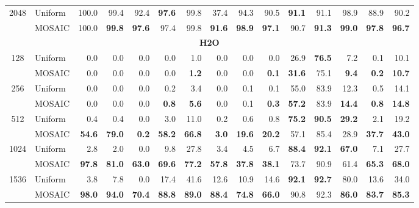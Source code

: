 \begin{table}[tp]
\begin{tabular}{@{} c l rrrrrrrrrrrrr @{}}
    \cmidrule(l){1-15}
    \multirow{2}{*}{2048} & Uniform & 100.0 & 99.4 & 92.4 & \textbf{97.6} & 99.8 & 37.4 & 94.3 & 90.5 & \textbf{91.1} & 91.1 & 98.9 & 88.9 & 90.2 \\
     & MOSAIC & 100.0 & \textbf{99.8} & \textbf{97.6} & 97.4 & 99.8 & \textbf{91.6} & \textbf{98.9} & \textbf{97.1} & 90.7 & \textbf{91.3} & \textbf{99.0} & \textbf{97.8} & \textbf{96.7} \\
    \midrule
    \multicolumn{15}{c}{\textbf{H2O}} \\
    \midrule
    \multirow{2}{*}{128} & Uniform & 0.0 & 0.0 & 0.0 & 0.0 & 1.0 & 0.0 & 0.0 & 0.0 & 26.9 & \textbf{76.5} & 7.2 & 0.1 & 10.1 \\
     & MOSAIC & 0.0 & 0.0 & 0.0 & 0.0 & \textbf{1.2} & 0.0 & 0.0 & \textbf{0.1} & \textbf{31.6} & 75.1 & \textbf{9.4} & \textbf{0.2} & \textbf{10.7} \\
    \cmidrule(l){1-15}
    \multirow{2}{*}{256} & Uniform & 0.0 & 0.0 & 0.0 & 0.2 & 3.4 & 0.0 & 0.1 & 0.1 & 55.0 & 83.9 & 12.3 & 0.5 & 14.1 \\
     & MOSAIC & 0.0 & 0.0 & 0.0 & \textbf{0.8} & \textbf{5.6} & 0.0 & 0.1 & \textbf{0.3} & \textbf{57.2} & 83.9 & \textbf{14.4} & \textbf{0.8} & \textbf{14.8} \\
    \cmidrule(l){1-15}
    \multirow{2}{*}{512} & Uniform & 0.4 & 0.4 & 0.0 & 3.0 & 11.0 & 0.2 & 0.6 & 0.8 & \textbf{75.2} & \textbf{90.5} & \textbf{29.2} & 2.1 & 19.2 \\
     & MOSAIC & \textbf{54.6} & \textbf{79.0} & \textbf{0.2} & \textbf{58.2} & \textbf{66.8} & \textbf{3.0} & \textbf{19.6} & \textbf{20.2} & 57.1 & 85.4 & 28.9 & \textbf{37.7} & \textbf{43.0} \\
    \cmidrule(l){1-15}
    \multirow{2}{*}{1024} & Uniform & 2.8 & 2.0 & 0.0 & 9.8 & 27.8 & 3.4 & 4.5 & 6.7 & \textbf{88.4} & \textbf{92.1} & \textbf{67.0} & 7.1 & 27.7 \\
     & MOSAIC & \textbf{97.8} & \textbf{81.0} & \textbf{63.0} & \textbf{69.6} & \textbf{77.2} & \textbf{57.8} & \textbf{37.8} & \textbf{38.1} & 73.7 & 90.9 & 61.4 & \textbf{65.3} & \textbf{68.0} \\
    \cmidrule(l){1-15}
    \multirow{2}{*}{1536} & Uniform & 3.8 & 7.8 & 0.0 & 17.4 & 41.6 & 12.6 & 10.9 & 14.6 & \textbf{92.1} & \textbf{92.7} & 80.0 & 13.6 & 34.0 \\
     & MOSAIC & \textbf{98.0} & \textbf{94.0} & \textbf{70.4} & \textbf{88.8} & \textbf{89.0} & \textbf{88.4} & \textbf{74.8} & \textbf{66.0} & 90.8 & 92.3 & \textbf{86.0} & \textbf{83.7} & \textbf{85.3} \\

\end{tabular}
\end{table}
